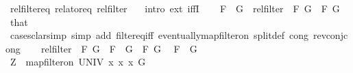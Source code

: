 \begin{isabellebody}
\isanewline
{}\isamarkupfalse%
\ rel{\isacharunderscore}{\kern0pt}filter{\isacharunderscore}{\kern0pt}eq\ {\isacharbrackleft}{\kern0pt}relator{\isacharunderscore}{\kern0pt}eq{\isacharbrackright}{\kern0pt}{\isacharcolon}{\kern0pt}\ {\isachardoublequoteopen}rel{\isacharunderscore}{\kern0pt}filter\ {\isacharparenleft}{\kern0pt}{\isacharequal}{\kern0pt}{\isacharparenright}{\kern0pt}\ {\isacharequal}{\kern0pt}\ {\isacharparenleft}{\kern0pt}{\isacharequal}{\kern0pt}{\isacharparenright}{\kern0pt}{\isachardoublequoteclose}\isanewline
%
\isadelimproof
%
\endisadelimproof
%
\isatagproof
{}\isamarkupfalse%
{\isacharparenleft}{\kern0pt}intro\ ext\ iffI{\isacharparenright}{\kern0pt}{\isacharplus}{\kern0pt}\isanewline
\ \ \isamarkupfalse%
\ {\isachardoublequoteopen}F\ {\isacharequal}{\kern0pt}\ G{\isachardoublequoteclose}\ \ {\isachardoublequoteopen}rel{\isacharunderscore}{\kern0pt}filter\ {\isacharparenleft}{\kern0pt}{\isacharequal}{\kern0pt}{\isacharparenright}{\kern0pt}\ F\ G{\isachardoublequoteclose}\ \ F\ G\ \isamarkupfalse%
\ that\isanewline
\ \ \ \ \isamarkupfalse%
\ cases{\isacharparenleft}{\kern0pt}clarsimp\ simp\ add{\isacharcolon}{\kern0pt}\ filter{\isacharunderscore}{\kern0pt}eq{\isacharunderscore}{\kern0pt}iff\ eventually{\isacharunderscore}{\kern0pt}map{\isacharunderscore}{\kern0pt}filter{\isacharunderscore}{\kern0pt}on\ split{\isacharunderscore}{\kern0pt}def\ cong{\isacharcolon}{\kern0pt}\ rev{\isacharunderscore}{\kern0pt}conj{\isacharunderscore}{\kern0pt}cong{\isacharparenright}{\kern0pt}\isanewline
\ \ \isamarkupfalse%
\ {\isachardoublequoteopen}rel{\isacharunderscore}{\kern0pt}filter\ {\isacharparenleft}{\kern0pt}{\isacharequal}{\kern0pt}{\isacharparenright}{\kern0pt}\ F\ G{\isachardoublequoteclose}\ \ {\isachardoublequoteopen}F\ {\isacharequal}{\kern0pt}\ G{\isachardoublequoteclose}\ \ F\ G\ \isamarkupfalse%
\ {\isacartoucheopen}F\ {\isacharequal}{\kern0pt}\ G{\isacartoucheclose}\isanewline
\ \ \isamarkupfalse%
\isanewline
\ \ \ \ \isamarkupfalse%
\ {\isacharquery}{\kern0pt}Z\ {\isacharequal}{\kern0pt}\ {\isachardoublequoteopen}map{\isacharunderscore}{\kern0pt}filter{\isacharunderscore}{\kern0pt}on\ UNIV\ {\isacharparenleft}{\kern0pt}{\isasymlambda}x{\isachardot}{\kern0pt}\ {\isacharparenleft}{\kern0pt}x{\isacharcomma}{\kern0pt}\ x{\isacharparenright}{\kern0pt}{\isacharparenright}{\kern0pt}\ G{\isachardoublequoteclose}\isanewline
\ \ \ \ \isamarkupfalse%

\end{isabellebody}
